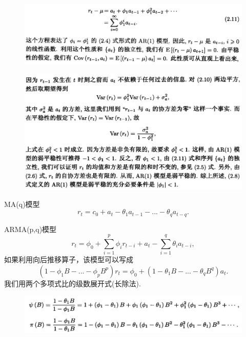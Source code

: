 \documentclass[UTF8]{ctexart}
\begin{document}
     \begin{figure}[h]
         \centering
         \includegraphics[scale=0.28]{images4.png}
     \end{figure}

     \begin{figure}[h]
         \centering
         \includegraphics[scale=0.28]{images5.png}
     \end{figure}

\hspace*{\fill}

MA(q)模型\[r_t=c_0+a_t-\theta_1 a_{t-1}-...-\theta_q a_{t-q}.\]

\hspace*{\fill}

ARMA(p,q)模型\[r_t=\phi_0+\sum_{i=1}^{p}\phi_i r_{t-i}+a_t-\sum_{i=1}^{q}\theta_i a_{t-i},\]如果利用向后推移算子，该模型可以写成\[(1-\phi_1 B-...-\phi_p B^p)r_t=\phi_0+(1-\theta_1 B-...-\theta_q B^q)a_t.\]我们用两个多项式比的级数展开式(长除法).

     \begin{figure}[h]
         \centering
         \includegraphics[scale=0.35]{images6.png}
     \end{figure}
\end{document}
